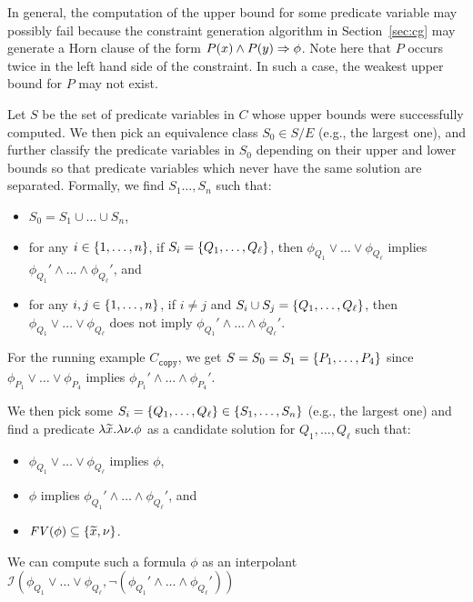 In general, the computation of the upper bound for some predicate
variable may possibly fail because the constraint generation algorithm
in Section~\ref{sec:cg} may generate a Horn clause of the form \(P(x)
\land P(y) \Rightarrow \phi\).  Note here that \(P\) occurs twice in the left
hand side of the constraint.  In such a case, the weakest upper bound
for \(P\) may not exist.

Let \(S\) be the set of predicate variables in \(C\) whose upper bounds
were successfully computed.  We then pick an equivalence class \(S_0 \in
S / E\) (e.g., the largest one), and further classify the predicate
variables in \(S_0\) depending on their upper and lower bounds so that
predicate variables which never have the same solution are separated.
%
Formally, we find \(S_1\dots,S_n\) such that:
\begin{itemize}
\item \(S_0 = S_1 \cup \dots \cup S_n\),
\item for any \(i \in \{{1,\dots,n}\}\), if \(S_i =
\{{Q_1,\dots,Q_{\ell}}\}\), then \(\phi_{Q_1} \lor \dots \lor
\phi_{Q_{\ell}}\) implies \(\phi_{Q_1}' \land \dots \land
\phi_{Q_{\ell}}'\), and
\item for any \(i,j \in \{{1,\dots,n}\}\), if \(i \neq j\) and
\(S_i \cup S_j = \{{Q_1,\dots,Q_{\ell}}\}\), then \(\phi_{Q_1} \lor
\dots \lor \phi_{Q_{\ell}}\) does not imply \(\phi_{Q_1}' \land \dots
\land \phi_{Q_{\ell}}'\).
\end{itemize}
For the running example \(C_{\texttt{copy}}\), we get
\(S=S_0=S_1=\{{P_1,\dots,P_4}\}\) since \(\phi_{P_1} \lor \dots \lor
\phi_{P_4}\) implies \(\phi_{P_1}' \land \dots \land \phi_{P_4}'\).

We then pick some \(S_i = \{{Q_1,\dots,Q_{\ell}}\} \in
\{{S_1,\dots,S_n}\}\) (e.g., the largest one) and find a predicate
\(\lambda\widetilde{x}.\lambda \nu.\phi\) as a candidate solution for
\(Q_1,\dots,Q_{\ell}\) such that:
\begin{itemize}
\item \(\phi_{Q_1} \lor \dots \lor \phi_{Q_{\ell}}\) implies \(\phi\),
\item \(\phi\) implies \(\phi_{Q_1}' \land \dots \land \phi_{Q_{\ell}}'\), and
\item \(\mathit{FV}({\phi}) \subseteq \{{\widetilde{x},\nu}\}\).
\end{itemize}
We can compute such a formula \(\phi\) as an interpolant
\(\mathcal{I}(\phi_{Q_1} \lor \dots \lor \phi_{Q_{\ell}},\neg
(\phi_{Q_1}' \land \dots \land \phi_{Q_{\ell}}'))\) 



